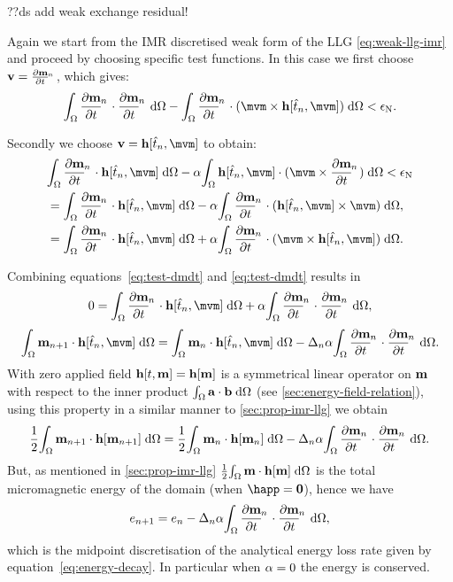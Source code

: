 ??ds add weak exchange residual!


Again we start from the IMR discretised weak form of the LLG \eqref{eq:weak-llg-imr} and proceed by choosing specific test functions.
In this case we first choose $\testv = \dmdtm$, which gives:
\begin{equation}
  \label{eq:test-dmdt}
  \begin{aligned}
    \intd{\dmdtm \cdot \dmdtm} - \intd{\dmdtm  \cdot (\mvm \times \hv[\tm, \mvm])} < \ntol.
  \end{aligned}
\end{equation}

Secondly we choose $\testv = \hv[\tm, \mvm]$ to obtain:
\begin{equation}
  \label{eq:test-h}
  \begin{aligned}
    &\intd{\dmdtm \cdot \hv[\tm, \mvm]} - \dampc \intd{\hv[\tm, \mvm] \cdot (\mvm \times \dmdtm)} < \ntol \\
    &= \intd{\dmdtm \cdot \hv[\tm, \mvm]} - \dampc \intd{\dmdtm \cdot (\hv[\tm, \mvm] \times \mvm)}, \\
    &= \intd{\dmdtm \cdot \hv[\tm, \mvm]} + \dampc \intd{\dmdtm \cdot (\mvm \times \hv[\tm, \mvm])}.
  \end{aligned}
\end{equation}

Combining equations~\eqref{eq:test-dmdt} and \eqref{eq:test-dmdt} results in
\begin{equation}
  0 = \intd{\dmdtm \cdot \hv[\tm, \mvm]} + \dampc \intd{\dmdtm \cdot \dmdtm},
\end{equation}
\ie
\begin{equation}
  \intd{\mv_{n+1} \cdot \hv[\tm, \mvm]} = \intd{\mv_n \cdot \hv[\tm, \mvm]} - \dtn \dampc \intd{\dmdtm \cdot \dmdtm}.
\end{equation}
With zero applied field $\mathbf{h}[t, \mathbf{m}] = \mathbf{h}[\mathbf{m}]$ is a symmetrical linear operator on $\mathbf{m}$ with respect to the inner product ${\int_{\Omega} {\mathbf{a}} \cdot {\mathbf{b}} {\; \text{d}} {\Omega}}$ (see \autoref{sec:energy-field-relation}), using this property in a similar manner to \autoref{sec:prop-imr-llg} we obtain
\begin{equation}
  \frac{1}{2}\intd{\mv_{n+1} \cdot \hv[\mv_{n+1}]} = \frac{1}{2}\intd{\mv_n \cdot \hv[\mv_n]} - \dtn \dampc \intd{\dmdtm \cdot \dmdtm}.
\end{equation}
But, as mentioned in \autoref{sec:prop-imr-llg} $\frac{1}{2}{\int_{\Omega} \mathbf{m} \cdot \mathbf{h}[\mathbf{m}] {\; \text{d}} {\Omega}}$ is the total micromagnetic energy of the domain (when $\happ = \zerov$), hence we have
\begin{equation}
  \e_{n+1} = \e_n - \dtn \dampc \intd{\dmdtm \cdot \dmdtm},
\end{equation}
which is the midpoint discretisation of the analytical energy loss rate given by equation~\eqref{eq:energy-decay}.
In particular when $\alpha = 0$ the energy is conserved.

